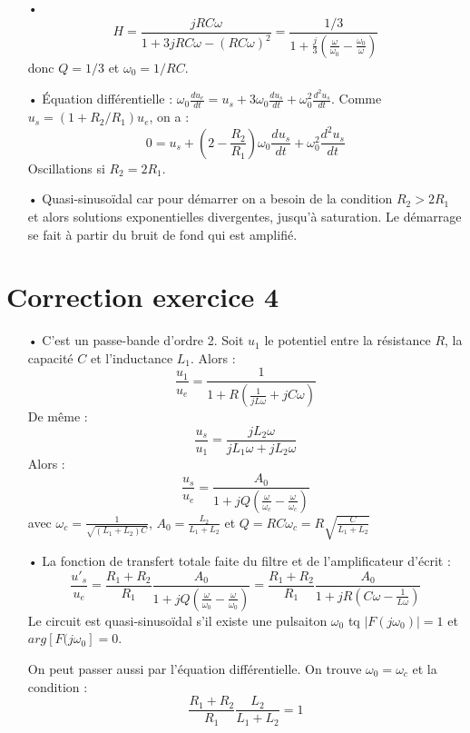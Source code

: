 \documentclass{report}
\begin{document}
\begin{itemize}
	\item[•]
	\begin{equation}
		H=\frac{jRC\omega}{1+3jRC\omega-(RC\omega)^2}=\frac{1/3}{1+\frac{j}{3}\left( \frac{\omega}{\omega_0}-\frac{\omega_0}{\omega}\right) }
	\end{equation}
	donc $Q=1/3$ et $\omega_0=1/RC$.
	\item[•] Équation différentielle : $\omega_0\frac{du_e}{dt}=u_s+3\omega_0\frac{du_s}{dt}+\omega_0^2\frac{d^2u_s}{dt}$. Comme $u_s = (1+R_2/R_1)u_e$, on a :
	\begin{equation}
	0=u_s+\left( 2-\frac{R_2}{R_1}\right) \omega_0\frac{du_s}{dt}+\omega_0^2\frac{d^2u_s}{dt}
	\end{equation}
	Oscillations si $R_2=2R_1$.
	\item[•] Quasi-sinusoïdal car pour démarrer on a besoin de la condition $R_2>2R_1$ et alors solutions exponentielles divergentes, jusqu'à saturation. Le démarrage se fait à partir du bruit de fond qui est amplifié. 
\end{itemize}

\section*{Correction exercice 4}

\begin{itemize}
	\item[•] C'est un passe-bande d'ordre 2. Soit $u_1$ le potentiel entre la résistance $R$, la capacité $C$ et l'inductance $L_1$. Alors :
	\begin{equation}
		\frac{u_1}{u_e}=\frac{1}{1+R\left(\frac{1}{jL\omega}+ jC\omega \right) }
	\end{equation}
	De même :
	\begin{equation}
		\frac{u_s}{u_1}=\frac{jL_2\omega}{jL_1\omega+jL_2\omega}
	\end{equation}
	Alors : 
	\begin{equation}
		\frac{u_s}{u_e}=\frac{A_0}{1+jQ\left( \frac{\omega}{\omega_c}- \frac{\omega}{\omega_c}\right)}
	\end{equation}
	avec $\omega_c=\frac{1}{\sqrt{(L_1+L_2)C}}$, $A_0=\frac{L_2}{L_1+L_2}$ et $Q=RC\omega_c=R\sqrt{\frac{C}{L_1+L_2}}$
	
	\item[•] La fonction de transfert totale faite du filtre et de l'amplificateur d'écrit : 
		\begin{equation}
		\frac{u'_s}{u_e}=\frac{R_1+R_2}{R_1}\frac{A_0}{1+jQ\left( \frac{\omega}{\omega_0}- \frac{\omega}{\omega_0}\right)}=\frac{R_1+R_2}{R_1}\frac{A_0}{1+jR\left(C\omega- \frac{1}{L\omega}\right)}
	\end{equation}
	Le circuit est quasi-sinusoïdal s'il existe une pulsaiton $\omega_0$ tq $\mid F(j\omega_0)\mid=1$ et $arg\left[F(j\omega_0 \right] =0 $.
	
	On peut passer aussi par l'équation différentielle.
	On trouve $\omega_0=\omega_c$ et la condition :
	\begin{equation}
		\frac{R_1+R_2}{R_1}\frac{L_2}{L_1+L_2}=1
	\end{equation}
\end{itemize}
	
\end{document}
